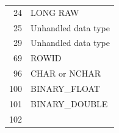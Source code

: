 \begin{appendix}
\begin{longtable}[]{@{}r|l@{}}
\begin{minipage}[t]{0.09\columnwidth}
24\strut
\end{minipage} & \begin{minipage}[t]{0.43\columnwidth}\raggedright\strut
LONG RAW\strut
\end{minipage}\tabularnewline
\begin{minipage}[t]{0.09\columnwidth}\raggedright\strut
25\strut
\end{minipage} & \begin{minipage}[t]{0.43\columnwidth}\raggedright\strut
Unhandled data type\strut
\end{minipage}\tabularnewline
\begin{minipage}[t]{0.09\columnwidth}\raggedright\strut
29\strut
\end{minipage} & \begin{minipage}[t]{0.43\columnwidth}\raggedright\strut
Unhandled data type\strut
\end{minipage}\tabularnewline
\begin{minipage}[t]{0.09\columnwidth}\raggedright\strut
69\strut
\end{minipage} & \begin{minipage}[t]{0.43\columnwidth}\raggedright\strut
ROWID\strut
\end{minipage}\tabularnewline
\begin{minipage}[t]{0.09\columnwidth}\raggedright\strut
96\strut
\end{minipage} & \begin{minipage}[t]{0.43\columnwidth}\raggedright\strut
CHAR or NCHAR\strut
\end{minipage}\tabularnewline
\begin{minipage}[t]{0.09\columnwidth}\raggedright\strut
100\strut
\end{minipage} & \begin{minipage}[t]{0.43\columnwidth}\raggedright\strut
BINARY\_FLOAT\strut
\end{minipage}\tabularnewline
\begin{minipage}[t]{0.09\columnwidth}\raggedright\strut
101\strut
\end{minipage} & \begin{minipage}[t]{0.43\columnwidth}\raggedright\strut
BINARY\_DOUBLE\strut
\end{minipage}\tabularnewline
\begin{minipage}[t]{0.09\columnwidth}\raggedright\strut
102\strut
\end{minipage} & \begin{minipage}[t]{0.43\columnwidth}\raggedright\strut

\end{minipage}
\end{longtable}
\end{appendix}
